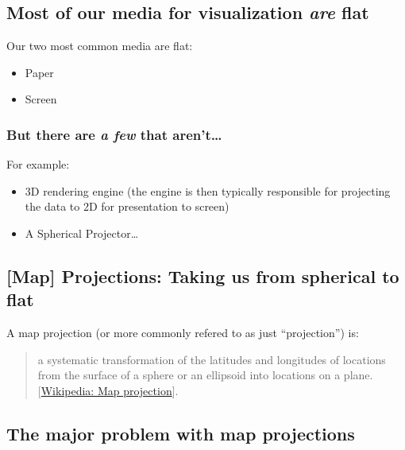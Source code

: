 \documentclass[11pt]{article}
\providecommand{\tightlist}{%
      \setlength{\itemsep}{0pt}\setlength{\parskip}{0pt}}
\begin{document}
    \hypertarget{most-of-our-media-for-visualization-are-flat}{%
\subsection{\texorpdfstring{Most of our media for visualization
\emph{are}
flat}{Most of our media for visualization are flat}}\label{most-of-our-media-for-visualization-are-flat}}

Our two most common media are flat:

\begin{itemize}
\tightlist
\item
  Paper
\item
  Screen
\end{itemize}

    \hypertarget{but-there-are-a-few-that-arent}{%
\subsubsection{\texorpdfstring{But there are \emph{a few} that
aren't\ldots{}}{But there are a few that aren't\ldots{}}}\label{but-there-are-a-few-that-arent}}

For example:

\begin{itemize}
\tightlist
\item
  3D rendering engine (the engine is then typically responsible for
  projecting the data to 2D for presentation to screen)
\item
  A Spherical Projector\ldots{}
\end{itemize}

    \hypertarget{map-projections-taking-us-from-spherical-to-flat}{%
\subsection{{[}Map{]} Projections: Taking us from spherical to
flat}\label{map-projections-taking-us-from-spherical-to-flat}}

A map projection (or more commonly refered to as just ``projection'')
is:

\begin{quote}
a systematic transformation of the latitudes and longitudes of locations
from the surface of a sphere or an ellipsoid into locations on a plane.
{[}\href{https://en.wikipedia.org/wiki/Map_projection}{Wikipedia: Map
projection}{]}.
\end{quote}

    \hypertarget{the-major-problem-with-map-projections}{%
\subsection{The major problem with map
projections}\label{the-major-problem-with-map-projections}}
\end{document}
